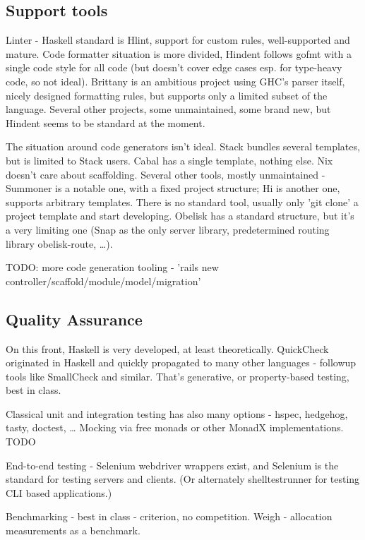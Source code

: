 \documentclass[english,odsaz]{fitthesis}
\begin{document}
\subsection{Support tools}
\label{sec:orgac67c30}
Linter - Haskell standard is Hlint, support for custom rules, well-supported and
mature. Code formatter situation is more divided, Hindent follows gofmt with a
single code style for all code (but doesn't cover edge cases esp. for type-heavy
code, so not ideal). Brittany is an ambitious project using GHC's parser itself,
nicely designed formatting rules, but supports only a limited subset of the
language. Several other projects, some unmaintained, some brand new, but Hindent
seems to be standard at the moment.

The situation around code generators isn't ideal. Stack bundles several
templates, but is limited to Stack users. Cabal has a single template, nothing
else. Nix doesn't care about scaffolding. Several other tools, mostly
unmaintained - Summoner is a notable one, with a fixed project structure; Hi is
another one, supports arbitrary templates. There is no standard tool, usually
only 'git clone' a project template and start developing. Obelisk has a standard
structure, but it's a very limiting one (Snap as the only server library,
predetermined routing library obelisk-route, \ldots{}).

TODO: more code generation tooling - 'rails new
controller/scaffold/module/model/migration'

\subsection{Quality Assurance}
\label{sec:orgf74ee0c}
On this front, Haskell is very developed, at least theoretically. QuickCheck
originated in Haskell and quickly propagated to many other languages - followup
tools like SmallCheck and similar. That's generative, or property-based testing,
best in class.

Classical unit and integration testing has also many options - hspec, hedgehog,
tasty, doctest, \ldots{} Mocking via free monads or other MonadX
implementations. TODO

End-to-end testing - Selenium webdriver wrappers exist, and Selenium is the
standard for testing servers and clients. (Or alternately shelltestrunner for
testing CLI based applications.)

Benchmarking - best in class - criterion, no competition. Weigh - allocation
measurements as a benchmark.
\end{document}
